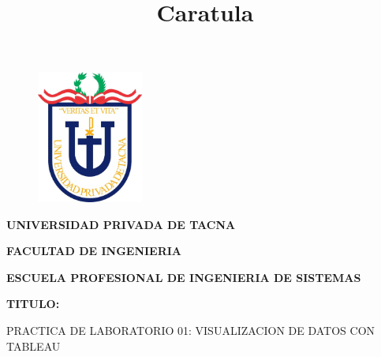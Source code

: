 \documentclass[12pt,letterpaper]{article}
\begin{document}
%

  
\title{Caratula}

\begin{titlepage}
    \begin{center}
    \begin{figure}[htb]
    \begin{center}
    \includegraphics[width=3.5cm]{./img/upt.jpg}
    \end{center}
    \end{figure}
    
    \vspace*{0.15in}
    \begin{Large}
    \textbf{UNIVERSIDAD PRIVADA DE TACNA}\\
    \end{Large}
    
    \vspace*{0.1in}
    \begin{Large}
    \textbf{FACULTAD DE INGENIERIA} \\
    \end{Large}
    
    \vspace*{0.1in}
    \begin{Large}
    \textbf{ESCUELA PROFESIONAL DE INGENIERIA DE SISTEMAS} \\
    \end{Large}
    
    \vspace*{0.5in}
    \begin{Large}
    \textbf{TITULO:}\\
    \end{Large}
    

\vspace*{0.1in}
\begin{Large}
    PRACTICA DE LABORATORIO 01: VISUALIZACION DE DATOS CON TABLEAU \\
\end{Large}


\end{center}
\end{titlepage}
\end{document}
